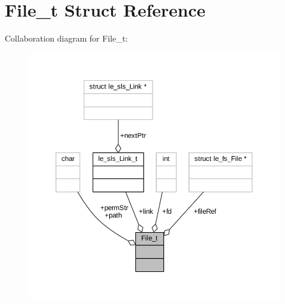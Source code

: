 \hypertarget{struct_file__t}{}\section{File\+\_\+t Struct Reference}
\label{struct_file__t}


Collaboration diagram for File\+\_\+t\+:
\nopagebreak
\begin{figure}[H]
\begin{center}
\leavevmode
\includegraphics[width=350pt]{struct_file__t__coll__graph}
\end{center}
\end{figure}
